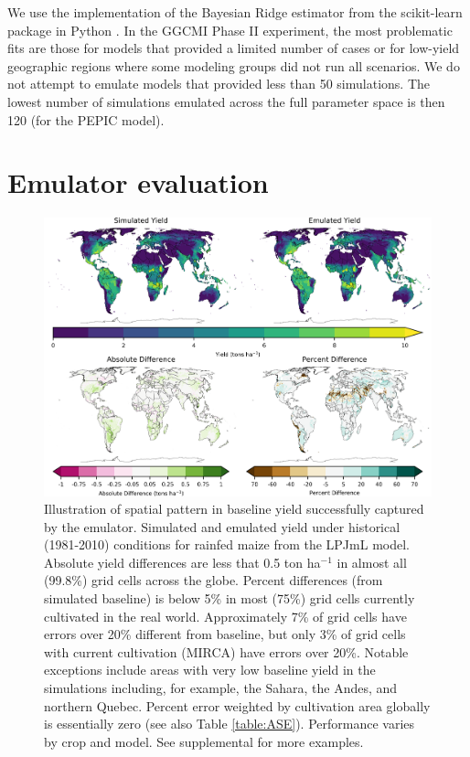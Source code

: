 \documentclass[gmd, manuscript]{copernicus} %
\begin{document}
We use the implementation of the Bayesian Ridge estimator from the scikit-learn package in Python \citep{scikit-learn}. 
In the GGCMI Phase II experiment, the most problematic fits are those for models that provided a limited number of cases or for low-yield geographic regions where some modeling groups did not run all scenarios. 
We do not attempt to emulate models that provided less than 50 simulations. 
The lowest number of simulations emulated across the full parameter space is then 120 (for the PEPIC model). 

\section{Emulator evaluation}
\label{S:4}
\begin{figure}[ht]
\centering
    \includegraphics[width=16cm]{figures/lpjml_maize.png}
    \caption{Illustration of spatial pattern in baseline yield successfully captured by the emulator.
    Simulated and emulated yield under historical (1981-2010) conditions for rainfed maize from the LPJmL model.
    Absolute yield differences are less that 0.5 ton ha$^{-1}$ in almost all (99.8\%) grid cells across the globe.
    Percent differences (from simulated baseline) is below 5\% in most (75\%) grid cells currently cultivated in the real world.
    Approximately 7\% of grid cells have errors over 20\% different from baseline, but only 3\% of grid cells with current cultivation (MIRCA) have errors over 20\%.
    Notable exceptions include areas with very low baseline yield in the simulations including, for example, the Sahara, the Andes, and northern Quebec. 
    Percent error weighted by cultivation area globally is essentially zero (see also Table \ref{table:ASE}).
    Performance varies by crop and model. 
    See supplemental for more examples.
    }
   \label{fig:map_pattern}
\end{figure}
\end{document}
